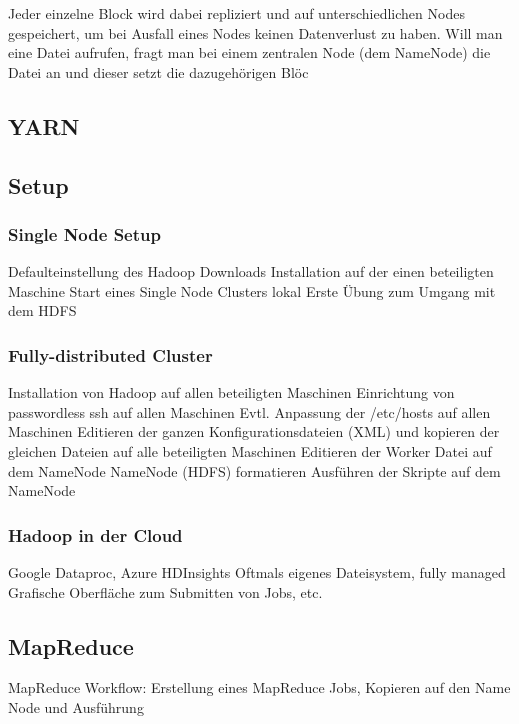 Jeder einzelne Block wird dabei repliziert und auf unterschiedlichen Nodes gespeichert, um bei Ausfall eines Nodes keinen Datenverlust zu haben. Will man eine Datei aufrufen, fragt man bei einem zentralen Node (dem NameNode) die Datei an und dieser setzt die dazugehörigen Blöc


\subsection{YARN}


\subsection{Setup}
\subsubsection*{Single Node Setup}
Defaulteinstellung des Hadoop Downloads
Installation auf der einen beteiligten Maschine
Start eines Single Node Clusters lokal
Erste Übung zum Umgang mit dem HDFS
\subsubsection*{Fully-distributed Cluster}
Installation von Hadoop auf allen beteiligten Maschinen
Einrichtung von passwordless ssh auf allen Maschinen
Evtl. Anpassung der /etc/hosts auf allen Maschinen
Editieren der ganzen Konfigurationsdateien (XML) und kopieren der gleichen Dateien auf alle beteiligten Maschinen
Editieren der Worker Datei auf dem NameNode
NameNode (HDFS) formatieren
Ausführen der Skripte auf dem NameNode

\subsubsection*{Hadoop in der Cloud}
Google Dataproc, Azure HDInsights
Oftmals eigenes Dateisystem, fully managed
Grafische Oberfläche zum Submitten von Jobs, etc.

\subsection{MapReduce}
MapReduce Workflow: Erstellung eines MapReduce Jobs, Kopieren auf den Name Node und Ausführung
